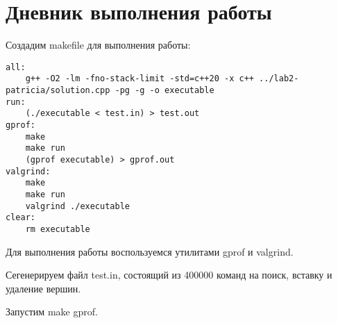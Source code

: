 \section{Дневник выполнения работы}

Создадим makefile для выполнения работы:
\begin{lstlisting}		
all:
	g++ -O2 -lm -fno-stack-limit -std=c++20 -x c++ ../lab2-patricia/solution.cpp -pg -g -o executable
run:
	(./executable < test.in) > test.out
gprof:
	make
	make run
	(gprof executable) > gprof.out
valgrind:
	make
	make run
	valgrind ./executable
clear:
	rm executable

\end{lstlisting}
Для выполнения работы воспользуемся утилитами gprof и valgrind.

Сегенерируем файл test.in, состоящий из 400000 команд на поиск, вставку и удаление вершин.

Запустим make gprof.

